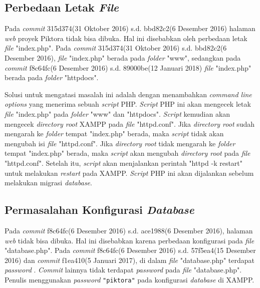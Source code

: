 \subsection{Perbedaan Letak \textit{File}}
\label{subsec:perbedaan_letak_file}
Pada \textit{commit} 315d374(31 Oktober 2016) s.d. bbd82c2(6 Desember 2016) halaman \textit{web} proyek Piktora tidak bisa dibuka. Hal ini disebabkan oleh perbedaan letak \textit{file} "index.php". Pada \textit{commit} 315d374(31 Oktober 2016) s.d. bbd82c2(6 Desember 2016), \textit{file} "index.php" berada pada \textit{folder} "www", sedangkan pada \textit{commit} f8c64fc(6 Desember 2016) s.d. 89000be(12 Januari 2018) \textit{file} "index.php" berada pada \textit{folder} "httpdocs".

Solusi untuk mengatasi masalah ini adalah dengan menambahkan \textit{command line options} yang menerima sebuah \textit{script} PHP. \textit{Script} PHP ini akan mengecek letak \textit{file} "index.php" pada \textit{folder} "www" dan "httpdocs". \textit{Script} kemudian akan mengecek \textit{directory root} XAMPP pada \textit{file} "httpd.conf".  Jika \textit{directory root} sudah mengarah ke \textit{folder} tempat "index.php" berada, maka \textit{script} tidak akan mengubah isi \textit{file} "httpd.conf". Jika \textit{directory root} tidak mengarah ke \textit{folder} tempat "index.php" berada, maka \textit{script} akan mengubah \textit{directory root} pada \textit{file} "httpd.conf". Setelah itu, \textit{script} akan menjalankan perintah "httpd -k restart" untuk melakukan \textit{restart} pada XAMPP. \textit{Script} PHP ini akan dijalankan sebelum melakukan migrasi \textit{database}.   


\subsection{Permasalahan Konfigurasi \textit{Database}}
\label{subsec:konfigurasi_database}
Pada \textit{commit} f8c64fc(6 Desember 2016) s.d. ace1988(6 Desember 2016), halaman \textit{web} tidak bisa dibuka. Hal ini disebabkan karena perbedaan konfigurasi pada \textit{file} "database.php". Pada \textit{commit} f8c64fc(6 Desember 2016) s.d. 57f5ea4(15 Desember 2016) dan \textit{commit} f1ea410(5 Januari 2017), di dalam \textit{file} "database.php" terdapat \textit{password} . \textit{Commit} lainnya tidak terdapat \textit{password} pada \textit{file} "database.php". Penulis menggunakan \textit{password} \texttt{"piktora"} pada konfigurasi \textit{database} di XAMPP.

